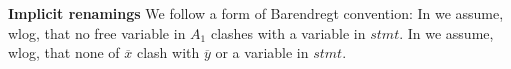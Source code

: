  \vspace{.1cm}

\noindent
\textbf{Implicit renamings} We follow a form of Barendregt convention: In  {}  we assume, wlog, that no free variable  in $A_1$   clashes with a variable  in $stmt$.
In {} we assume, wlog, that none of
 $\overline x$ clash with  $\overline y$ or a variable  in $stmt$. 


 




 
